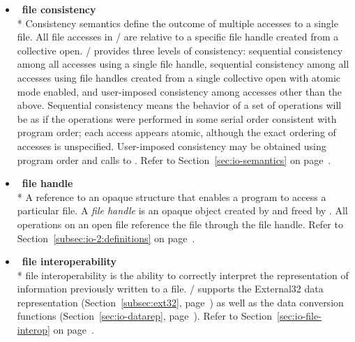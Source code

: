 \begin{itemize}
\label{glossary:file_consistency}
\item  ~\hypertarget{glossary:file_consistency}{\textbf{file consistency}} \\*
Consistency semantics define the outcome of multiple accesses
to a single file.
All file accesses in \MPI/ are relative to a specific file handle
created from a collective open.
\MPI/ provides three levels of consistency:
sequential consistency among all accesses using a single file handle,
sequential consistency among all accesses
using file handles created from a single collective open
with atomic mode enabled,
and
user-imposed consistency among accesses other than the above.
Sequential consistency means the behavior of a set of operations
will be as if the operations were performed in some serial order
consistent with program order; each access appears atomic,
although the exact ordering of accesses is unspecified.
User-imposed consistency may be obtained using program order
and calls to .
Refer to Section~\ref{sec:io-semantics} on page~\pageref{sec:io-semantics}.

\label{glossary:file_handle}
\item  ~\hypertarget{glossary:file_handle}{\textbf{file handle}} \\*
A reference to an opaque structure that enables a program to access a particular file.
A {\it file handle} is an opaque object created by 
and freed by .
All operations on an open file
reference the file through the file handle.
Refer to Section~\ref{subsec:io-2:definitions} on page~\pageref{subsec:io-2:definitions}.

\label{glossary:file_interoperability}
\item  ~\hypertarget{glossary:file_interoperability}{\textbf{file interoperability}} \\*
file interoperability is the ability to
correctly interpret the representation of
 information previously written to a file.
\MPI/ supports the External32 data representation (Section~\ref{subsec:ext32}, page~\pageref{subsec:ext32}) as
well as the data conversion functions (Section~\ref{sec:io-datarep},
page~\pageref{sec:io-datarep}). 
Refer to Section~\ref{sec:io-file-interop} on page~\pageref{sec:io-file-interop}.


\end{itemize}
